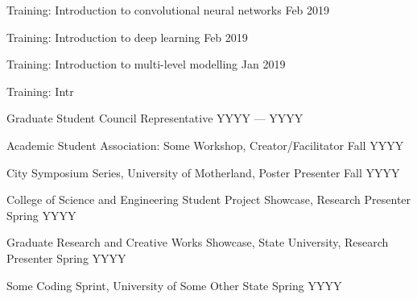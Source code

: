 
Training: Introduction to convolutional neural networks \hfill Feb 2019

Training: Introduction to deep learning \hfill Feb 2019


Training: Introduction to multi-level modelling \hfill Jan 2019

Training: Intr


 Graduate Student Council Representative	\hfill YYYY --- YYYY
 
Academic Student Association: Some Workshop, Creator/Facilitator	\hfill Fall YYYY

City Symposium Series, University of Motherland, Poster Presenter	\hfill Fall YYYY

College of Science and Engineering Student Project Showcase, Research Presenter	\hfill Spring YYYY

Graduate Research and Creative Works Showcase, State University, Research Presenter	\hfill Spring YYYY

Some Coding Sprint, University of Some Other State	\hfill Spring YYYY


